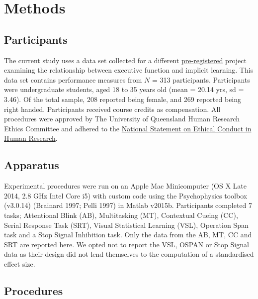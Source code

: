 \documentclass{article}
\begin{document}
\hypertarget{methods}{%
\section{Methods}\label{methods}}

\label{sec:Method}

\hypertarget{participants}{%
\subsection{Participants}\label{participants}}

\label{sec:Participants}

The current study uses a data set collected for a different \href{https://osf.io/nxysg}{pre-registered} project examining the relationship between executive function and implicit learning. This data set contains performance measures from \(N\) = 313 participants. Participants were undergraduate students, aged 18 to 35 years old (mean = 20.14 yrs, sd = 3.46). Of the total sample, 208 reported being female, and 269 reported being right handed. Participants received course credits as compensation. All procedures were approved by The University of Queensland Human Research Ethics Committee and adhered to the \href{https://www.nhmrc.gov.au/about-us/publications/national-statement-ethical-conduct-human-research-2007-updated-2018}{National Statement on Ethical Conduct in Human Research}.

\hypertarget{apparatus}{%
\subsection{Apparatus}\label{apparatus}}

\label{sec:Apparatus}

Experimental procedures were run on an Apple Mac Minicomputer (OS X Late 2014, 2.8 GHz Intel Core i5) with custom code using the Psychophysics toolbox (v3.0.14) (Brainard 1997; Pelli 1997) in Matlab v2015b. Participants completed 7 tasks; Attentional Blink (AB), Multitasking (MT), Contextual Cueing (CC), Serial Response Task (SRT), Visual Statistical Learning (VSL), Operation Span task and a Stop Signal Inhibition task. Only the data from the AB, MT, CC and SRT are reported here. We opted not to report the VSL, OSPAN or Stop Signal data as their design did not lend themselves to the computation of a standardised effect size.

\hypertarget{procedures}{%
\subsection{Procedures}\label{procedures}}
\end{document}
